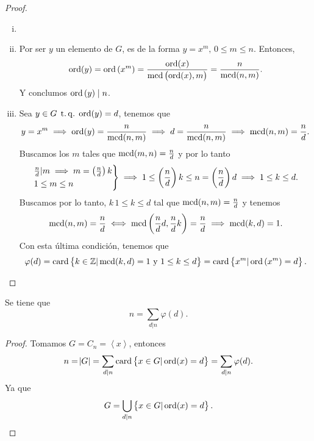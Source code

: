 \begin{proof}
    \begin{enumerate}[i)]
        \item[]
        \item Por ser $y$ un elemento de $G$, es de la forma $y=x^m,\,0\leq m\leq n$. Entonces,
                \[
                    \operatorname{ord}(y) = \operatorname{ord}\left( x^m \right) = \frac{\operatorname{ord}(x)}{\operatorname{mcd}\left(\operatorname{ord}(x), m \right)} = \frac{n}{\operatorname{mcd}(n, m)}.
                \]
            Y conclumos $\operatorname{ord}\left( y\right) \mid n$.
        \item Sea $y \in G \operatorname{\;t.q.\;} \operatorname{ord}(y) = d$, tenemos que
                \[
                    y = x^m \implies \operatorname{ord}(y) = \frac{n}{\operatorname{mcd}(n, m)} \implies d = \frac{n}{\operatorname{mcd}(n, m)} 
                    \implies \operatorname{mcd}(n, m) = \frac{n}{d}.
                \]
                Buscamos los $m$ tales que $\operatorname{mcd}(m, n) = \frac{n}{d}$ y por lo tanto
                \[
                    \begin{rcases}
                        \frac{n}{d} \vert m \implies m = \left( \frac{n}{d} \right)k \\
                        1 \leq m \leq n
                    \end{rcases}
                    \implies 1 \leq \left( \frac{n}{d} \right)k \leq n = \left( \frac{n}{d} \right)d
                    \implies 1 \leq k \leq d.
                \]
                Buscamos por lo tanto, $k\, 1 \leq k \leq d$ tal que $\operatorname{mcd}(n, m) = \frac{n}{d}$ y tenemos
                \[
                    \operatorname{mcd}(n, m) = \frac{n}{d} \iff \operatorname{mcd}\left( \frac{n}{d}d, \frac{n}{d}k \right) = \frac{n}{d}
                    \implies \operatorname{mcd}(k, d) = 1.
                \]
                Con esta última condición, tenemos que
                \[
                    \varphi(d) = \operatorname{card} \left\{ k \in \mathbb{Z} \vert \operatorname{mcd}(k, d) = 1 \text{ y } 1 \leq k \leq d\right\}
                    = \operatorname{card} \left\{ x^m \vert \operatorname{ord}\left( x^m \right) = d\right\}.
                \]
    \end{enumerate}
\end{proof}

\begin{col}
    Se tiene que
    \[
        n = \sum_{d \vert n} \varphi(d).
    \]
\end{col}

\begin{proof}
    Tomamos $G = C_n = \left< x \right>$, entonces
    \[
        n = \abs{G} = \sum_{d \vert n} \operatorname{card} \left\{ x \in G \vert \operatorname{ord}(x) =d \right\} = \sum_{d \vert n} \varphi(d).
    \]
    Ya que
    \[
        G = \bigcup_{d \vert n} \left\{x \in G \vert \operatorname{ord}(x) = d\right\}.
    \]
\end{proof}
